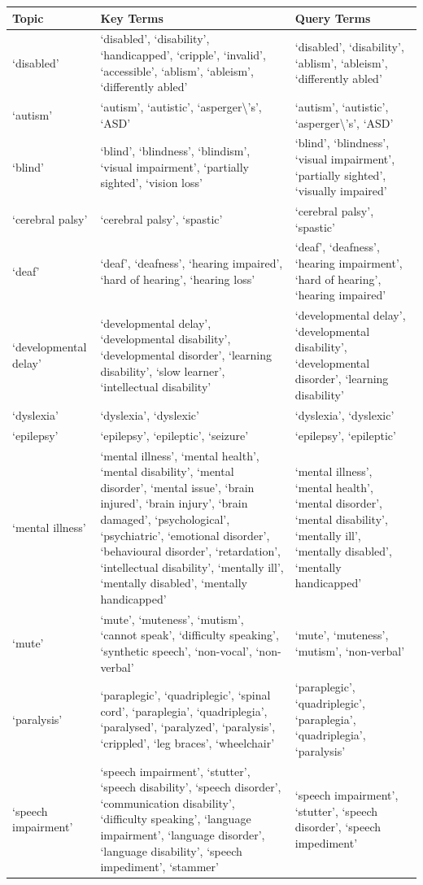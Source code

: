 \documentclass{report}
\begin{document}
\begin{longtabu} to \textwidth { | X[l] | X[l] | X[l] | } 
	\hline
	Topic & Key Terms & Query Terms \\ 
	\hline
	`disabled' & `disabled', `disability', `handicapped', `cripple', `invalid', `accessible', `ablism', `ableism', `differently abled' & `disabled', `disability', `ablism', `ableism', `differently abled' \\ 
	\hline
	`autism' & `autism', `autistic', `asperger\textbackslash's', `ASD' & `autism', `autistic', `asperger\textbackslash's', `ASD' \\ 
	\hline
	`blind' & `blind', `blindness', `blindism', `visual impairment', `partially sighted', `vision loss' & `blind', `blindness', `visual impairment', `partially sighted', `visually impaired' \\ 
	\hline
	`cerebral palsy' & `cerebral palsy', `spastic' & `cerebral palsy', `spastic' \\ 
	\hline
	`deaf' & `deaf', `deafness', `hearing impaired', `hard of hearing', `hearing loss' & `deaf', `deafness', `hearing impairment', `hard of hearing', `hearing impaired' \\ 
	\hline
	`developmental delay' & `developmental delay', `developmental disability', `developmental disorder', `learning disability', `slow learner', `intellectual disability' & `developmental delay', `developmental disability', `developmental disorder', `learning disability' \\ 
	\hline
	`dyslexia' & `dyslexia', `dyslexic' & `dyslexia', `dyslexic' \\ 
	\hline
	`epilepsy' & `epilepsy', `epileptic', `seizure' & `epilepsy', `epileptic' \\ 
	\hline
	`mental illness' & `mental illness', `mental health', `mental disability', `mental disorder', `mental issue', `brain injured', `brain injury', `brain damaged', `psychological', `psychiatric', `emotional disorder', `behavioural disorder', `retardation', `intellectual disability', `mentally ill', `mentally disabled', `mentally handicapped' & `mental illness', `mental health', `mental disorder', `mental disability', `mentally ill', `mentally disabled', `mentally handicapped' \\ 
	\hline
	`mute' & `mute', `muteness', `mutism', `cannot speak', `difficulty speaking', `synthetic speech', `non-vocal', `non-verbal' & `mute', `muteness', `mutism', `non-verbal' \\ 
	\hline
	`paralysis' & `paraplegic', `quadriplegic', `spinal cord', `paraplegia', `quadriplegia', `paralysed', `paralyzed', `paralysis', `crippled', `leg braces', `wheelchair' & `paraplegic', `quadriplegic', `paraplegia', `quadriplegia', `paralysis' \\ 
	\hline
	`speech impairment' & `speech impairment', `stutter', `speech disability', `speech disorder', `communication disability', `difficulty speaking', `language impairment', `language disorder', `language disability', `speech impediment', `stammer' & `speech impairment', `stutter', `speech disorder', `speech impediment' \\ 
	\hline
\end{longtabu}
\end{document}
